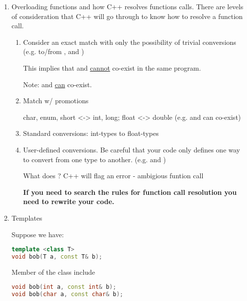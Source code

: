 \begin{enumerate}
  \item Overloading functions and how C++ resolves functions calls.
There are levels of consideration that C++ will go through to know how to resolve a function call.
  \begin{enumerate}
    \item Consider an exact match with only the possibility of trivial conversions (e.g.  to/from ,  and )

    This implies that  and  \underline{cannot} co-exist in the same program.
    
    Note:  and  \underline{can} co-exist.

    \item Match w/ promotions

    char, enum, short <-> int, long; float <-> double (e.g.  and  can co-exist)

    \item Standard conversions: int-types to float-types

    \item User-defined conversions. Be careful that your code only defines one way to convert from one type to another. (e.g.  and )

    What does ? C++ will flag an error - ambigious funtion call

    \textbf{If you need to search the rules for function call resolution you need to rewrite your code.}
  \end{enumerate}

  \item Templates

  Suppose we have:

\begin{lstlisting}[language=C++]
template <class T>
void bob(T a, const T& b);
\end{lstlisting}

  Member of the class include
  
\begin{lstlisting}[language=C++]
void bob(int a, const int& b);
void bob(char a, const char& b);
\end{lstlisting}

\end{enumerate}

